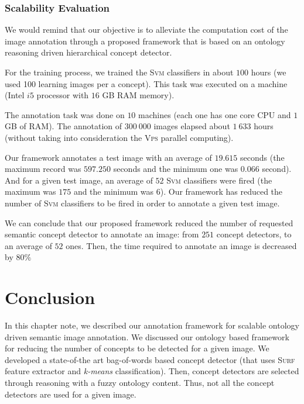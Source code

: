 			
			\subsubsection{Scalability Evaluation}

			We would remind that our objective is to alleviate the computation cost of the 
			image annotation through a proposed framework that is based on an ontology 
			reasoning driven hierarchical concept detector.

			For the training process, we trained the \textsc{Svm} classifiers in about $100$ hours
			(we used 100 learning images per a concept). This task was executed on 
			a  machine (Intel $i5$ processor with $16$ GB RAM memory).
	
			The annotation task was done on $10$ machines (each one has one core 
			CPU and $1$ GB of RAM). The annotation of $300~000$ images elapsed about $1~633$ hours 
			(without taking into consideration the \textsc{Vps} parallel computing).

			Our framework annotates a test image with an average of $19.615$ seconds (the maximum record 
			was $597.250$ seconds and the minimum one was $0.066$ second). 
			And for a given test image, an average of $52$ \textsc{Svm} classifiers were fired
			(the maximum was $175$ and the minimum was $6$). Our framework has reduced 
			the number of \textsc{Svm} classifiers to be fired in order to annotate a given test image.

			We can conclude that our proposed framework reduced the number of requested semantic 
			concept detector to annotate an image: from $251$ concept detectors, to an average of $52$
			ones. Then, the time required to annotate an image is decreased by $80\%$





	\section{Conclusion}
	\label{c3_4}

	In this chapter note, we described our annotation framework for scalable ontology driven 
	semantic image annotation. We discussed our ontology based framework for reducing the number of 
	concepts to be detected for a given image. We developed a state-of-the art bag-of-words based 
	concept detector (that uses \textsc{Surf} feature extractor and \textit{k-means} classification).
	Then, concept detectors are selected through reasoning with a fuzzy ontology content. Thus, not all 
	the concept detectors are used for a given image. 


